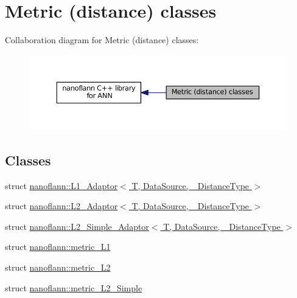 \hypertarget{group__metric__grp}{\section{Metric (distance) classes}
\label{group__metric__grp}
}
Collaboration diagram for Metric (distance) classes\-:
\nopagebreak
\begin{figure}[H]
\begin{center}
\leavevmode
\includegraphics[width=350pt]{group__metric__grp}
\end{center}
\end{figure}
\subsection*{Classes}
\begin{DoxyCompactItemize}
\item 
struct \hyperlink{structnanoflann_1_1_l1___adaptor}{nanoflann\-::\-L1\-\_\-\-Adaptor$<$ T, Data\-Source, \-\_\-\-Distance\-Type $>$}
\item 
struct \hyperlink{structnanoflann_1_1_l2___adaptor}{nanoflann\-::\-L2\-\_\-\-Adaptor$<$ T, Data\-Source, \-\_\-\-Distance\-Type $>$}
\item 
struct \hyperlink{structnanoflann_1_1_l2___simple___adaptor}{nanoflann\-::\-L2\-\_\-\-Simple\-\_\-\-Adaptor$<$ T, Data\-Source, \-\_\-\-Distance\-Type $>$}
\item 
struct \hyperlink{structnanoflann_1_1metric___l1}{nanoflann\-::metric\-\_\-\-L1}
\item 
struct \hyperlink{structnanoflann_1_1metric___l2}{nanoflann\-::metric\-\_\-\-L2}
\item 
struct \hyperlink{structnanoflann_1_1metric___l2___simple}{nanoflann\-::metric\-\_\-\-L2\-\_\-\-Simple}
\end{DoxyCompactItemize}
